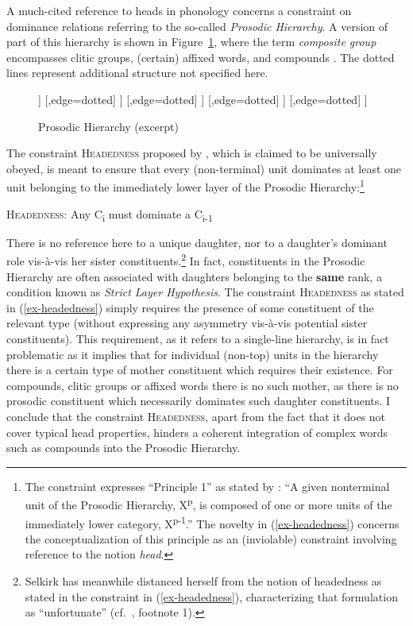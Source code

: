 \documentclass[output=paper
 ,nobabel
 ,draftmode
 ,colorlinks, citecolor=brown
]{langscibook}
\begin{document}
A much-cited reference to heads in phonology concerns a constraint on dominance relations referring to the so-called \emph{Prosodic Hierarchy}. A version of part of this hierarchy is shown in Figure~\ref{ex-hierarchy}, where the term \emph{composite group} encompasses clitic groups, (certain) affixed words, and compounds \citep[xvii]{NesporVogel2007}. The dotted lines represent additional structure not specified here.


\begin{figure}
\begin{forest}
[utterance (U)
        [,edge=dotted]
	[composite group (CG), edge=dotted
		[,edge=dotted]
		[phonological word (ω)
			[,edge=dotted]
			[foot (Σ)
				[,edge=dotted]
				[syllable (σ)
					[,edge=dotted]
				]
				[,edge=dotted]
			]
			[,edge=dotted]
		]
		[,edge=dotted]
	]
        [,edge=dotted]
]
\end{forest}
\caption{Prosodic Hierarchy (excerpt)}\label{ex-hierarchy}
\end{figure}

\largerpage
The constraint \textsc{Headedness} proposed by \citet[443]{Selkirk1995}, which is claimed to be universally obeyed, is meant to ensure that every (non-terminal) unit dominates at least one unit belonging to the immediately lower layer of the Prosodic Hierarchy:\footnote{The constraint expresses ``Principle 1'' as stated by \citet[7]{NesporVogel2007}: ``A given nonterminal unit of the Prosodic Hierarchy, X\textsuperscript{p}, is composed of one or more units of the immediately lower category, X\textsuperscript{p-1}.'' The novelty in (\ref{ex-headedness}) concerns the conceptualization of this principle as an (inviolable) constraint involving reference to the notion \emph{head}.} 

\ea\label{ex-headedness}
\textsc{Headedness}: Any C\textsubscript{i} must dominate a C\textsubscript{i-1}
\z

\noindent
There is no reference here to a unique daughter, nor to a daughter's dominant role vis-à-vis her sister constituents.\footnote{Selkirk has meanwhile distanced herself from the notion of headedness as stated in the constraint in (\ref{ex-headedness}), characterizing that formulation as ``unfortunate'' (cf.\ \citealp*[1]{ElordietaSelkirk2018}, footnote 1).} 
%
In fact, constituents in the Prosodic Hierarchy are often associated with daughters belonging to the {\bf same} rank, a condition known as \emph{Strict Layer Hypothesis}. The constraint \textsc{Headedness} as stated in (\ref{ex-headedness}) simply requires the presence of some constituent of the relevant type (without expressing any asymmetry vis-à-vis potential sister constituents). This requirement, as it refers to a single-line hierarchy, is in fact problematic as it implies that for individual (non-top) units in the hierarchy there is a certain type of mother constituent which requires their existence. For compounds, clitic groups or affixed words there is no such mother, as there is no  prosodic constituent which necessarily dominates such daughter constituents. I conclude that the constraint \textsc{Headedness}, apart from the fact that it does not cover typical head properties, hinders a coherent integration of complex words such as compounds into the Prosodic Hierarchy. 
\end{document}
